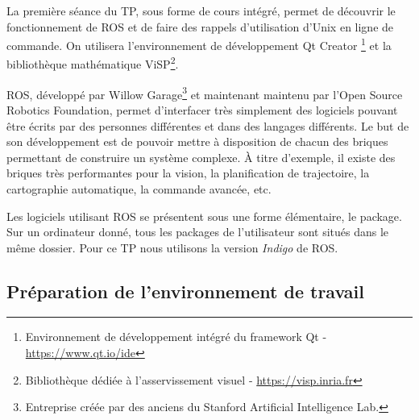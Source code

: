 \documentclass[12pt,a4paper]{article}
\begin{document}
\hspace{12pt}La première séance du TP, sous forme de cours intégré, permet de découvrir le fonctionnement de ROS et de faire des rappels d'utilisation d'Unix en ligne de commande. On utilisera l'environnement de développement Qt Creator \footnote{Environnement de développement intégré  du framework Qt - \url{https://www.qt.io/ide}} et la bibliothèque mathématique ViSP\footnote{ Bibliothèque dédiée à l'asservissement visuel - \url{https://visp.inria.fr}}.

\medskip ROS, développé par Willow Garage\footnote{Entreprise créée par des anciens du Stanford Artificial Intelligence Lab.} et maintenant maintenu par l'Open Source Robotics Foundation, permet d'interfacer très simplement des logiciels pouvant être écrits par des personnes différentes et dans des langages différents. Le but de son développement est de pouvoir mettre à disposition de chacun des briques permettant de construire un système complexe. À titre d'exemple, il existe des briques très performantes pour la vision, la planification de trajectoire, la cartographie automatique, la commande avancée, etc.

\medskip Les logiciels utilisant ROS se présentent sous une forme élémentaire, le package. Sur un ordinateur donné, tous les packages de l'utilisateur sont situés dans le même dossier. Pour ce TP nous utilisons la version \emph{Indigo} de ROS.

\subsection{Préparation de l'environnement de travail}

\def\bin{<binôme>}
\def\ros{\url{~}/ros}
\end{document}
